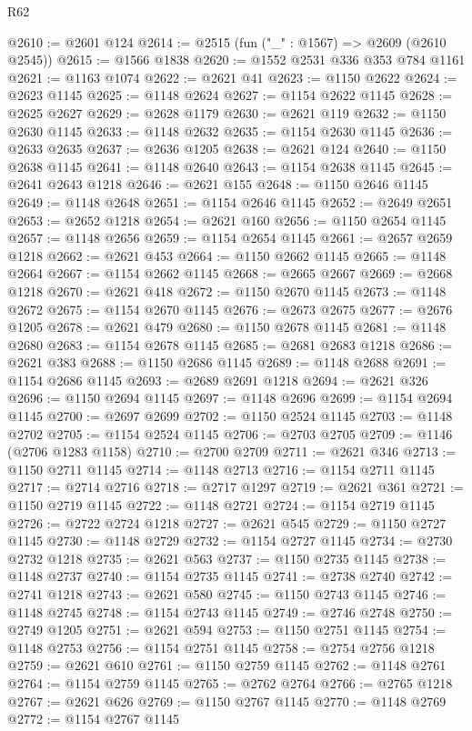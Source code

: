 \begin{lexlean}{R62}
\begin{coremodule}
@2610 := @2601 @124
@2614 := @2515 (fun ("_" : @1567) => @2609 (@2610 @2545))
@2615 := @1566 @1838
@2620 := @1552 @2531 @336 @353 @784 @1161
@2621 := @1163 @1074
@2622 := @2621 @41
@2623 := @1150 @2622
@2624 := @2623 @1145
@2625 := @1148 @2624
@2627 := @1154 @2622 @1145
@2628 := @2625 @2627
@2629 := @2628 @1179
@2630 := @2621 @119
@2632 := @1150 @2630 @1145
@2633 := @1148 @2632
@2635 := @1154 @2630 @1145
@2636 := @2633 @2635
@2637 := @2636 @1205
@2638 := @2621 @124
@2640 := @1150 @2638 @1145
@2641 := @1148 @2640
@2643 := @1154 @2638 @1145
@2645 := @2641 @2643 @1218
@2646 := @2621 @155
@2648 := @1150 @2646 @1145
@2649 := @1148 @2648
@2651 := @1154 @2646 @1145
@2652 := @2649 @2651
@2653 := @2652 @1218
@2654 := @2621 @160
@2656 := @1150 @2654 @1145
@2657 := @1148 @2656
@2659 := @1154 @2654 @1145
@2661 := @2657 @2659 @1218
@2662 := @2621 @453
@2664 := @1150 @2662 @1145
@2665 := @1148 @2664
@2667 := @1154 @2662 @1145
@2668 := @2665 @2667
@2669 := @2668 @1218
@2670 := @2621 @418
@2672 := @1150 @2670 @1145
@2673 := @1148 @2672
@2675 := @1154 @2670 @1145
@2676 := @2673 @2675
@2677 := @2676 @1205
@2678 := @2621 @479
@2680 := @1150 @2678 @1145
@2681 := @1148 @2680
@2683 := @1154 @2678 @1145
@2685 := @2681 @2683 @1218
@2686 := @2621 @383
@2688 := @1150 @2686 @1145
@2689 := @1148 @2688
@2691 := @1154 @2686 @1145
@2693 := @2689 @2691 @1218
@2694 := @2621 @326
@2696 := @1150 @2694 @1145
@2697 := @1148 @2696
@2699 := @1154 @2694 @1145
@2700 := @2697 @2699
@2702 := @1150 @2524 @1145
@2703 := @1148 @2702
@2705 := @1154 @2524 @1145
@2706 := @2703 @2705
@2709 := @1146 (@2706 @1283 @1158)
@2710 := @2700 @2709
@2711 := @2621 @346
@2713 := @1150 @2711 @1145
@2714 := @1148 @2713
@2716 := @1154 @2711 @1145
@2717 := @2714 @2716
@2718 := @2717 @1297
@2719 := @2621 @361
@2721 := @1150 @2719 @1145
@2722 := @1148 @2721
@2724 := @1154 @2719 @1145
@2726 := @2722 @2724 @1218
@2727 := @2621 @545
@2729 := @1150 @2727 @1145
@2730 := @1148 @2729
@2732 := @1154 @2727 @1145
@2734 := @2730 @2732 @1218
@2735 := @2621 @563
@2737 := @1150 @2735 @1145
@2738 := @1148 @2737
@2740 := @1154 @2735 @1145
@2741 := @2738 @2740
@2742 := @2741 @1218
@2743 := @2621 @580
@2745 := @1150 @2743 @1145
@2746 := @1148 @2745
@2748 := @1154 @2743 @1145
@2749 := @2746 @2748
@2750 := @2749 @1205
@2751 := @2621 @594
@2753 := @1150 @2751 @1145
@2754 := @1148 @2753
@2756 := @1154 @2751 @1145
@2758 := @2754 @2756 @1218
@2759 := @2621 @610
@2761 := @1150 @2759 @1145
@2762 := @1148 @2761
@2764 := @1154 @2759 @1145
@2765 := @2762 @2764
@2766 := @2765 @1218
@2767 := @2621 @626
@2769 := @1150 @2767 @1145
@2770 := @1148 @2769
@2772 := @1154 @2767 @1145

\end{coremodule}
\end{lexlean}
